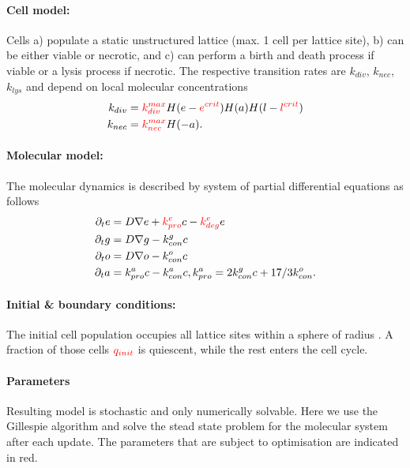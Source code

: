 \documentclass[10pt,letterpaper]{article}
\begin{document}
\paragraph{Cell model:} Cells a) populate a static unstructured lattice (max. 1 cell per lattice site), b) can be either viable or necrotic, and c) can perform a birth and death process if viable or a lysis process if necrotic. The respective transition rates are $k_{div}$, $k_{nec}$, $k_{lys}$ and depend on local molecular concentrations
\begin{align}
	k_{div}  &= {\color{red}{k_{div}^{max}}} H(e-{\color{red}{e^{crit}}}) H(a) H(l-{\color{red}{l^{crit}}})\\
	k_{nec} &= {\color{red}{k_{nec}^{max}}} H(-a).
\end{align}

\paragraph{Molecular model:} The molecular dynamics is described by system of partial differential equations as follows
\begin{align}
	\partial_{t} e &= D \nabla e + {\color{red}{k^{e}_{pro}}} c - {\color{red}{k^{e}_{deg}}} e\\
	\partial_{t} g &= D \nabla g - k^{g}_{con} c\\
	\partial_{t} o &= D \nabla o - k^{o}_{con} c\\
	\partial_{t} a &=k^{a}_{pro}c - k^{a}_{con} c, k^{a}_{pro} =  2k^{g}_{con} c + 17/3 k^{o}_{con}.
\end{align}

\paragraph{Initial \& boundary conditions:}
The initial cell population occupies all lattice sites within a sphere of radius {}. A fraction of those cells $\color{red}{q_{init}}$ is quiescent, while the rest enters the cell cycle.

\paragraph{Parameters} 

Resulting model is stochastic and only numerically solvable. Here we use the Gillespie algorithm and solve the stead state problem for the molecular system after each update. The parameters that are subject to optimisation are indicated in red.
\end{document}
